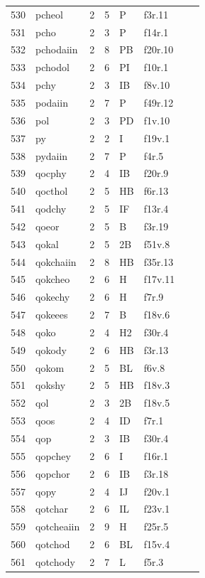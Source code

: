 \documentclass[11pt,a4paper]{article}
\begin{document}
\begin{landscape}
\begin{longtable}{@{}r>{\ttfamily}lrrl>{\ttfamily}l>{\raggedright\arraybackslash}p{80mm}>{\raggedright\arraybackslash}p{36mm}@{}}
530 & pcheol & 2 & 5 & P & f3r.11 &  & \\
531 & pcho & 2 & 3 & P & f14r.1 &  & \\
532 & pchodaiin & 2 & 8 & PB & f20r.10 &  & \\
533 & pchodol & 2 & 6 & PI & f10r.1 &  & \\
534 & pchy & 2 & 3 & IB & f8v.10 &  & \\
535 & podaiin & 2 & 7 & P & f49r.12 &  & \\
536 & pol & 2 & 3 & PD & f1v.10 &  & \\
537 & py & 2 & 2 & I & f19v.1 &  & \\
538 & pydaiin & 2 & 7 & P & f4r.5 &  & \\
539 & qocphy & 2 & 4 & IB & f20r.9 &  & \\
540 & qocthol & 2 & 5 & HB & f6r.13 &  & \\
541 & qodchy & 2 & 5 & IF & f13r.4 &  & \\
542 & qoeor & 2 & 5 & B & f3r.19 &  & \\
543 & qokal & 2 & 5 & 2B & f51v.8 &  & \\
544 & qokchaiin & 2 & 8 & HB & f35r.13 &  & \\
545 & qokcheo & 2 & 6 & H & f17v.11 &  & \\
546 & qokechy & 2 & 6 & H & f7r.9 &  & \\
547 & qokeees & 2 & 7 & B & f18v.6 &  & \\
548 & qoko & 2 & 4 & H2 & f30r.4 &  & \\
549 & qokody & 2 & 6 & HB & f3r.13 &  & \\
550 & qokom & 2 & 5 & BL & f6v.8 &  & \\
551 & qokshy & 2 & 5 & HB & f18v.3 &  & \\
552 & qol & 2 & 3 & 2B & f18v.5 &  & \\
553 & qoos & 2 & 4 & ID & f7r.1 &  & \\
554 & qop & 2 & 3 & IB & f30r.4 &  & \\
555 & qopchey & 2 & 6 & I & f16r.1 &  & \\
556 & qopchor & 2 & 6 & IB & f3r.18 &  & \\
557 & qopy & 2 & 4 & IJ & f20v.1 &  & \\
558 & qotchar & 2 & 6 & IL & f23v.1 &  & \\
559 & qotcheaiin & 2 & 9 & H & f25r.5 &  & \\
560 & qotchod & 2 & 6 & BL & f15v.4 &  & \\
561 & qotchody & 2 & 7 & L & f5r.3 &  & \\

\end{longtable}
\end{landscape}
\end{document}
